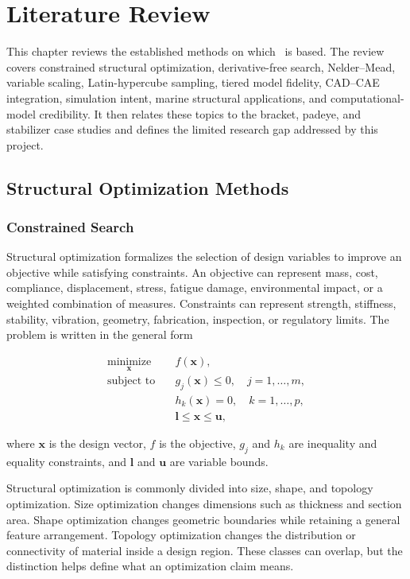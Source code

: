 \chapter{Literature Review}
\label{chap:literature}

This chapter reviews the established methods on which \NEMO\ is based. The
review covers constrained structural optimization, derivative-free search,
Nelder--Mead, variable scaling, Latin-hypercube sampling, tiered model
fidelity, CAD--CAE integration, simulation intent, marine structural
applications, and computational-model credibility. It then relates these
topics to the bracket, padeye, and stabilizer case studies and defines the
limited research gap addressed by this project.

\section{Structural Optimization Methods}
\label{sec:structural-optimization}

\subsection{Constrained Search}

Structural optimization formalizes the selection of design variables to
improve an objective while satisfying constraints. An objective can represent
mass, cost, compliance, displacement, stress, fatigue damage, environmental
impact, or a weighted combination of measures. Constraints can represent
strength, stiffness, stability, vibration, geometry, fabrication, inspection,
or regulatory limits. The problem is written in the general form

\begin{align}
\underset{\mathbf{x}}{\text{minimize}}\quad
    & f(\mathbf{x}), \label{eq:general-objective}\\
\text{subject to}\quad
    & g_j(\mathbf{x})\leq 0,\quad j=1,\ldots,m,\\
    & h_k(\mathbf{x})=0,\quad k=1,\ldots,p,\\
    & \mathbf{l}\leq\mathbf{x}\leq\mathbf{u},
\end{align}

where $\mathbf{x}$ is the design vector, $f$ is the objective, $g_j$ and
$h_k$ are inequality and equality constraints, and $\mathbf{l}$ and
$\mathbf{u}$ are variable bounds.

Structural optimization is commonly divided into size, shape, and topology
optimization. Size optimization changes dimensions such as thickness and
section area. Shape optimization changes geometric boundaries while retaining
a general feature arrangement. Topology optimization changes the distribution
or connectivity of material inside a design region. These classes can overlap,
but the distinction helps define what an optimization claim means.


